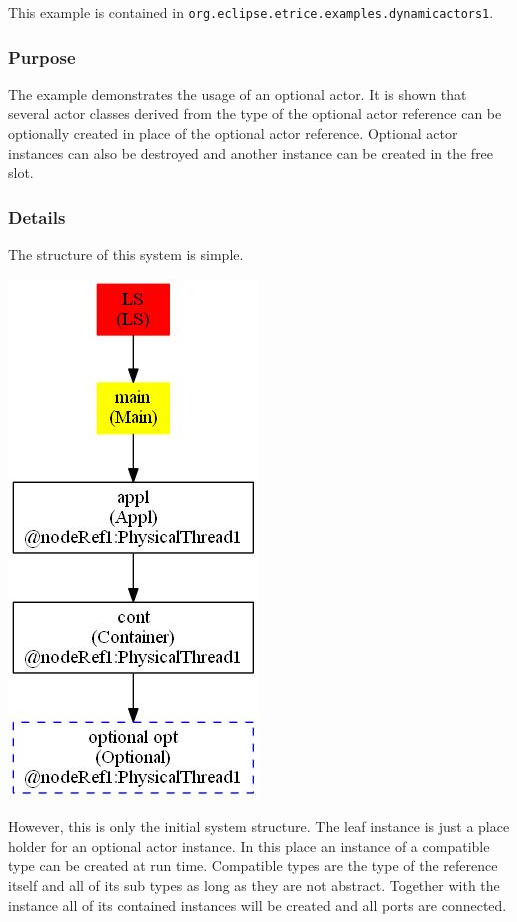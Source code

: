 This example is contained in \texttt{org.eclipse.etrice.examples.dynamicactors1}.

\subsubsection{Purpose}

The example demonstrates the usage of an optional actor. It is shown that several actor classes
derived from the type of the optional actor reference can be optionally created in place
of the optional actor reference. Optional actor instances can also be destroyed
and another instance can be created in the free slot.

\subsubsection{Details}

The structure of this system is simple.

\includegraphics[scale=0.7]{images/039-DynAct1-Main_instanceTree.jpg}

However, this is only the initial system structure.
The leaf instance is just a place holder for an optional actor instance.
In this place an instance of a compatible type can be created at run time.
Compatible types are the type of the reference itself and all of its sub types as long as they are not abstract.
Together with the instance all of its contained instances will be created and all ports are connected.

